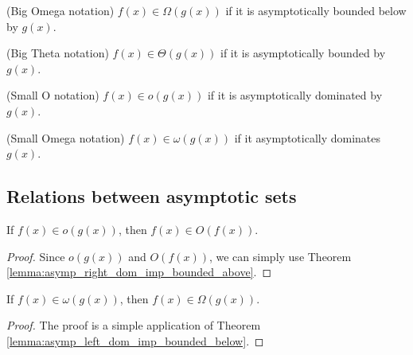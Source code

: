 \begin{definition}(Big Omega notation)
    \label{def:big_omega}
    \leanok
    $f(x) \in \Omega(g(x))$ if it is asymptotically bounded below by $g(x)$.
\end{definition}

\begin{definition}(Big Theta notation)
    \label{def:big_theta}
    \leanok
    $f(x) \in \Theta(g(x))$ if it is asymptotically bounded by $g(x)$. 
\end{definition}

\begin{definition}(Small O notation)
    \label{def:small_o}
    \leanok
    $f(x) \in o(g(x))$ if it is asymptotically dominated by $g(x)$.
\end{definition}

\begin{definition}(Small Omega notation)
    \label{def:small_omega}
    \leanok
    $f(x) \in \omega(g(x))$ if it asymptotically dominates $g(x)$.
\end{definition}


\subsection{Relations between asymptotic sets}

\begin{lemma}
    \label{lemma:small_o_imp_big_o}
    \leanok
    If $f(x) \in o(g(x))$, then $f(x) \in O(f(x))$.
\end{lemma}

\begin{proof}
    \leanok
    Since $o(g(x))$ and $O(f(x))$, we can simply use Theorem 
    \ref{lemma:asymp_right_dom_imp_bounded_above}.
\end{proof}

\begin{theorem}
    \label{thm:small_omega_imp_big_omega}
    \leanok
    If $f(x) \in \omega(g(x))$, then $f(x) \in \Omega(g(x))$.
\end{theorem}

\begin{proof}
    \leanok
    The proof is a simple application of Theorem 
    \ref{lemma:asymp_left_dom_imp_bounded_below}.
\end{proof}

